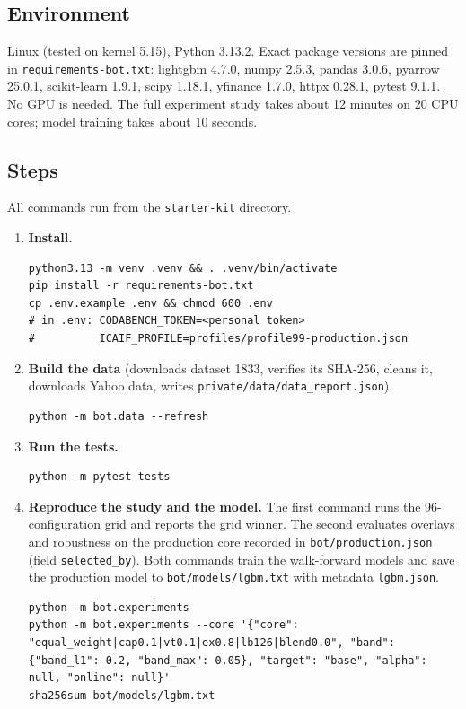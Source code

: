 \documentclass[11pt,a4paper]{article}
\newcommand{\code}[1]{\texttt{#1}}
\begin{document}
\subsection{Environment}
Linux (tested on kernel 5.15), Python 3.13.2. Exact package versions are pinned in \code{requirements-bot.txt}:
lightgbm 4.7.0, numpy 2.5.3, pandas 3.0.6, pyarrow 25.0.1, scikit-learn 1.9.1, scipy 1.18.1, yfinance 1.7.0, httpx
0.28.1, pytest 9.1.1. No GPU is needed. The full experiment study takes about 12 minutes on 20 CPU cores; model
training takes about 10 seconds.

\subsection{Steps}
All commands run from the \code{starter-kit} directory.
\begin{enumerate}[leftmargin=1.4em]
\item \textbf{Install.}
\begin{lstlisting}
python3.13 -m venv .venv && . .venv/bin/activate
pip install -r requirements-bot.txt
cp .env.example .env && chmod 600 .env
# in .env: CODABENCH_TOKEN=<personal token>
#          ICAIF_PROFILE=profiles/profile99-production.json
\end{lstlisting}
\item \textbf{Build the data} (downloads dataset 1833, verifies its SHA-256, cleans it, downloads Yahoo data, writes
\code{private/data/data\_report.json}).
\begin{lstlisting}
python -m bot.data --refresh
\end{lstlisting}
\item \textbf{Run the tests.}
\begin{lstlisting}
python -m pytest tests
\end{lstlisting}
\item \textbf{Reproduce the study and the model.} The first command runs the 96-configuration grid and reports the grid
winner. The second evaluates overlays and robustness on the production core recorded in \code{bot/production.json}
(field \code{selected\_by}). Both commands train the walk-forward models and save the production model to
\code{bot/models/lgbm.txt} with metadata \code{lgbm.json}.
\begin{lstlisting}
python -m bot.experiments
python -m bot.experiments --core '{"core": "equal_weight|cap0.1|vt0.1|ex0.8|lb126|blend0.0", "band": {"band_l1": 0.2, "band_max": 0.05}, "target": "base", "alpha": null, "online": null}'
sha256sum bot/models/lgbm.txt

\end{lstlisting}
\end{enumerate}
\end{document}
